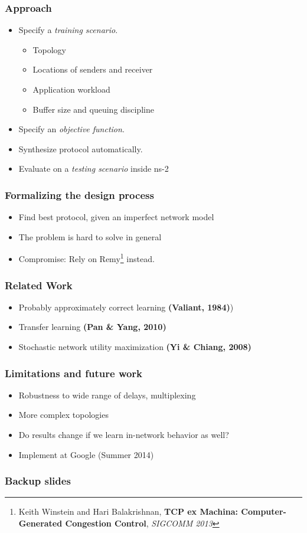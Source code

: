 \documentclass[svgnames]{beamer}
\begin{document}
\begin{Large}
\begin{frame}
\frametitle{Approach}
\begin{itemize}
\item Specify a \textit{training scenario}.
\begin{itemize}
\item Topology
\item Locations of senders and receiver
\item Application workload
\item Buffer size and queuing discipline 
\end{itemize}
\item Specify an \textit{objective function}.
\item Synthesize protocol automatically.
\item Evaluate on a \textit{testing scenario} inside ns-2
\end{itemize}
\end{frame}

\begin{frame}
\frametitle{Formalizing the design process}
\begin{itemize}
\item Find best protocol, given an imperfect network model
\item The problem is hard to solve in general
\item<2-> Compromise: Rely on Remy\footnote<2->{Keith Winstein and Hari Balakrishnan, \textbf{TCP ex Machina: Computer-Generated Congestion Control}, \textit{SIGCOMM 2013}} instead.
\end{itemize}
\end{frame}












\begin{frame}
\frametitle{Related Work}
\begin{itemize}
\item Probably approximately correct learning \textbf{(Valiant, 1984)})
\item Transfer learning \textbf{(Pan \& Yang, 2010)}
\item Stochastic network utility maximization \textbf{(Yi \& Chiang, 2008)}
\end{itemize}
\end{frame}

\begin{frame}
\frametitle{Limitations and future work}
\begin{itemize}
\item Robustness to wide range of delays, multiplexing
\item More complex topologies
\item Do results change if we learn in-network behavior as well?
\item Implement at Google (Summer 2014)
\end{itemize}
\end{frame}
\end{Large}

\begin{frame}
\frametitle{Backup slides}
\end{frame}

\end{document}
